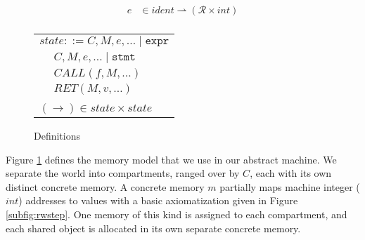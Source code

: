 \documentclass{article}
\begin{document}
\begin{figure}
\begin{minipage}[t]{0.49\textwidth}
\[\begin{aligned}
    e & \in \mathit{ident} \rightharpoonup (\mathcal{R} \times \mathit{int}) \\
    \end{aligned}\]
    \begin{tabular}{l | l}
      \multicolumn{2}{r}{\(\mathit{state} ::= C, M, e, \ldots \mid \mathtt{expr}\)} \\
      \hspace{4em} & \(C, M, e, \ldots \mid \mathtt{stmt}\) \\
      \hspace{4em} & \(\mathit{CALL}(f, M, \ldots)\)  \\
      \hspace{4em} & \(\mathit{RET}(M, v, \ldots)\) \\
      \multicolumn{2}{l}{} \\
      \multicolumn{2}{l}{\hspace{1.5em}\((\longrightarrow) \in \mathit{state} \times \mathit{state}\)} \\
    \end{tabular}
  \end{minipage}

  \caption{Definitions}
  \label{fig:memmod}
\end{figure}

Figure \ref{fig:memmod} defines the memory model that we use in our abstract machine.
We separate the world into compartments, ranged over by \(C\), each with its own distinct
concrete memory. A concrete memory \(m\) partially maps machine
integer (\(\mathit{int}\)) addresses to values with a basic axiomatization given in
Figure \ref{subfig:rwstep}. One memory of this kind is assigned to each compartment, and
each shared object is allocated in its own separate concrete memory.
\end{document}
